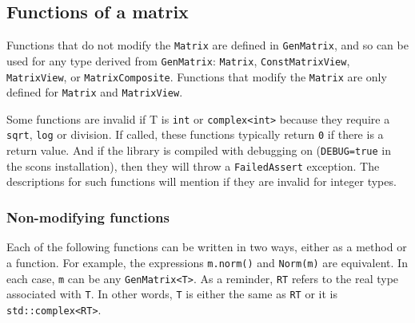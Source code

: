 \documentclass[twoside,letterpaper,11pt]{article}
\renewcommand{\tt}[1]{{\lstinline {#1}}}
\begin{document}
\subsection{Functions of a matrix}
\label{Matrix_Functions}

Functions that do not modify the \tt{Matrix} are defined in 
\tt{GenMatrix}, and so can be used for any type derived from \tt{GenMatrix}:
\tt{Matrix}, \tt{ConstMatrixView}, \tt{MatrixView}, or \tt{MatrixComposite}.
Functions that modify the \tt{Matrix} are only defined for 
\tt{Matrix} and \tt{MatrixView}.

Some functions are invalid if T is \tt{int} or \tt{complex<int>} because they require 
a \tt{sqrt}, \tt{log} or division.  If called, these functions typically return \tt{0} if there is a return value.
And if the library is compiled with debugging on (\tt{DEBUG=true} in the scons installation),
then they will throw a \tt{FailedAssert} exception.  The descriptions for such functions
will mention if they are invalid for integer types.

\subsubsection{Non-modifying functions}

Each of the following functions can be written in two ways,
either as a method or a function.
For example, the expressions \tt{m.norm()} and \tt{Norm(m)}
are equivalent.  
In each case, \tt{m} can be any \tt{GenMatrix<T>}.
As a reminder, \tt{RT} refers to the real type associated with \tt{T}.
In other words, \tt{T} is either the same as \tt{RT} or it is
\tt{std::complex<RT>}.
\end{document}
